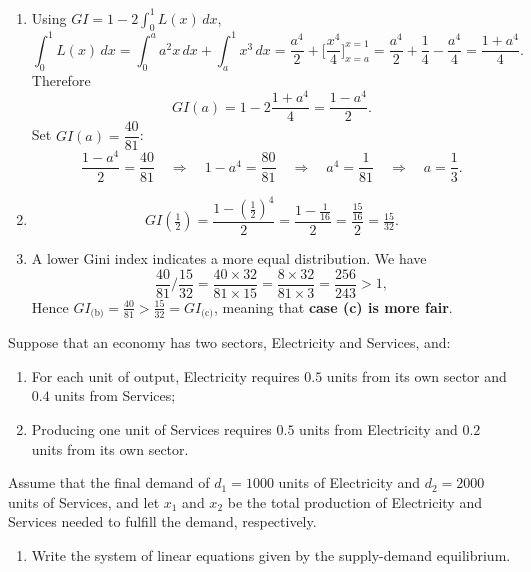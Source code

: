 \documentclass[11pt]{exam}
\begin{document}
\begin{questions}
\begin{solution}
\begin{enumerate}[leftmargin=0.55cm, label=(\alph*), rightmargin=0.2cm]
\item 
Using $GI=1-2\int_0^1 L(x)\,dx$,
\[
\int_0^1 L(x)\,dx
=\int_0^a a^2x\,dx+\int_a^1 x^3\,dx
=\frac{a^4}{2}+\Big[\frac{x^4}{4}\Big]_{x=a}^{x=1}
=\frac{a^4}{2}+\frac{1}{4}-\frac{a^4}{4}
=\frac{1+a^4}{4}.
\]
Therefore
\[
GI(a)=1-2\frac{1+a^4}{4}
=\frac{1-a^4}{2}.
\]
Set $GI(a)=\dfrac{40}{81}$:
\[
\frac{1-a^4}{2}=\frac{40}{81}
\quad\Longrightarrow\quad
1-a^4=\frac{80}{81}
\quad\Longrightarrow\quad
a^4=\frac{1}{81}
\quad\Longrightarrow\quad
a=\frac{1}{3}.
\]

\item 
\[
GI\!\left(\tfrac{1}{2}\right)
=\frac{1-(\tfrac{1}{2})^4}{2}
=\frac{1-\tfrac{1}{16}}{2}
=\frac{\tfrac{15}{16}}{2}
=\tfrac{15}{32}.
\]

\item 
A lower Gini index indicates a more equal distribution. We have
\[
\frac{40}{81}\Big/\frac{15}{32} = \frac{40\times32}{81\times 15} = \frac{8\times32}{81\times 3} = \frac{256}{243} > 1,
\]
Hence $GI_{\text{(b)}}=\frac{40}{81} > \frac{15}{32} = GI_{\text{(c)}}$, meaning that \textbf{case (c) is more fair}.

\end{enumerate}
\end{solution}



\question[3]
     Suppose that an economy has two sectors, Electricity and Services, and:
     \begin{enumerate}[leftmargin = 0.5cm, label = (\textit{\roman*}), rightmargin = 0.2cm]
        \item For each unit of output, Electricity requires $0.5$ units from its own sector and $0.4$ units from Services;
        \item Producing one unit of Services requires $0.5$ units from Electricity and $0.2$ units from its own sector.
     \end{enumerate}
        Assume that the final demand of $d_1 = 1000$ units of Electricity and $d_2 = 2000$ units of Services, and let $x_1$ and $x_2$ be the total production of Electricity and Services needed to fulfill the demand, respectively.

        \begin{enumerate}[leftmargin = 0.5cm, label = (\alph*), rightmargin = 0.2cm]
        
            \item Write the system of linear equations given by the supply-demand equilibrium.
            

\end{enumerate}
\end{questions}
\end{document}
